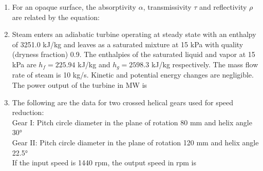 \documentclass[journal,11pt,onecolumn]{IEEEtran}
\begin{document}
\begin{enumerate}
    \item For an opaque surface, the absorptivity \(\alpha\), transmissivity \(\tau\) and reflectivity \(\rho\) are related by the equation:

          \begin{enumerate}
          \end{enumerate}

    \item Steam enters an adiabatic turbine operating at steady state with an enthalpy of 3251.0 kJ/kg and leaves as a saturated mixture at 15 kPa with quality (dryness fraction) 0.9. The enthalpies of the saturated liquid and vapor at 15 kPa are \(h_f = 225.94\) kJ/kg and \(h_g = 2598.3\) kJ/kg respectively. The mass flow rate of steam is 10 kg/s. Kinetic and potential energy changes are negligible. The power output of the turbine in MW is

          \begin{enumerate}
          \end{enumerate}

    \item The following are the data for two crossed helical gears used for speed reduction:\\
          Gear I: Pitch circle diameter in the plane of rotation 80 mm and helix angle 30°\\
          Gear II: Pitch circle diameter in the plane of rotation 120 mm and helix angle 22.5°\\
          If the input speed is 1440 rpm, the output speed in rpm is

          \begin{enumerate}
          \end{enumerate}


\end{enumerate}
\end{document}
